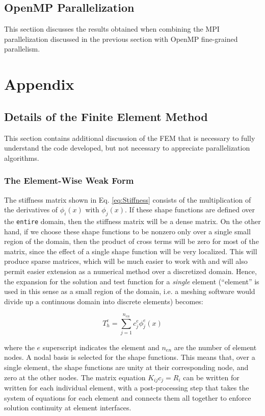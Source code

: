 \documentclass[10pt]{article}
\newcommand{\beq}{\begin{equation}}
\newcommand{\eeq}{\end{equation}}
\begin{document}
\subsection{OpenMP Parallelization}

This sectiion discusses the results obtained when combining the MPI parallelization discussed in the previous section with OpenMP fine-grained parallelism.












\section{Appendix}
\subsection{Details of the Finite Element Method}
This section contains additional discussion of the FEM that is necessary to fully understand the code developed, but not necessary to appreciate parallelization algorithms.

\subsubsection{The Element-Wise Weak Form}
The stiffness matrix shown in Eq. \eqref{eq:Stiffness} consists of the multiplication of the derivatives of \(\phi_i(x)\) with \(\phi_j(x)\). If these shape functions are defined over the {\tt entire} domain, then the stiffness matrix will be a dense matrix. On the other hand, if we choose these shape functions to be nonzero only over a single small region of the domain, then the product of cross terms will be zero for most of the matrix, since the effect of a single shape function will be very localized. This will produce sparse matrices, which will be much easier to work with and will also permit easier extension as a numerical method over a discretized domain. Hence, the expansion for the solution and test function for a {\it single} element (``element'' is used in this sense as a small region of the domain, i.e. a meshing software would divide up a continuous domain into discrete elements) becomes:

\beq
T_h^e=\sum_{j=1}^{n_{en}}c_j^e\phi_j^e(x)
\eeq

where the \(e\) superscript indicates the element and \(n_{en}\) are the number of element nodes. A nodal basis is selected for the shape functions. This means that, over a single element, the shape functions are unity at their corresponding node, and zero at the other nodes. The matrix equation \(K_{ij}c_j=R_i\) can be written for written for each individual element, with a post-processing step that takes the system of equations for each element and connects them all together to enforce solution continuity at element interfaces. 
\end{document}
